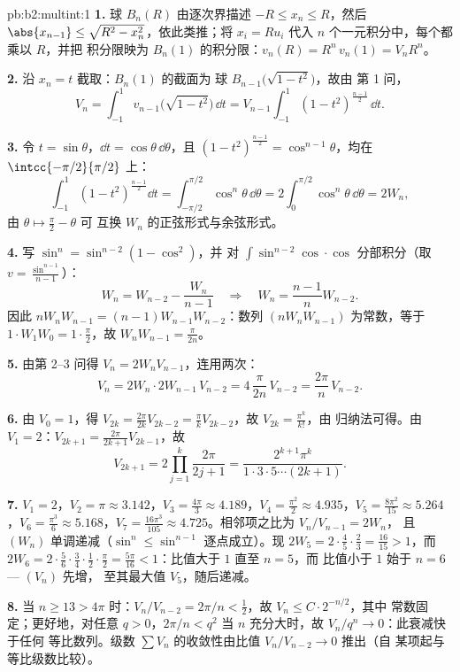 \begin{solution}{pb:b2:multint:1}
\textbf{1.} 球 $B_n(R)$ 由逐次界描述
$-R \leq x_n \leq R$，然后 $\abs{x_{n-1}} \leq \sqrt{R^2 -
x_n^2}$，依此类推；将 $x_i = Ru_i$ 代入
$n$ 个一元积分中，每个都乘以 $R$，并把
积分限映为 $B_n(1)$ 的积分限：$v_n(R) = R^n\,v_n(1) =
V_nR^n$。

\textbf{2.} 沿 $x_n = t$ 截取：$B_n(1)$ 的截面为
球 $B_{n-1}\bigl(\sqrt{1 - t^2}\bigr)$，故由
第 1 问，
\[
V_n = \int_{-1}^1 v_{n-1}\bigl(\sqrt{1 - t^2}\bigr)\,\dd t
= V_{n-1}\int_{-1}^{1}(1 - t^2)^{\frac{n-1}2}\,\dd t .
\]

\textbf{3.} 令 $t = \sin\theta$，$\dd t =
\cos\theta\,\dd\theta$，且 $(1 - t^2)^{\frac{n-1}2} =
\cos^{n-1}\theta$，均在 $\intcc{-\pi/2}{\pi/2}$ 上：
\[
\int_{-1}^1(1 - t^2)^{\frac{n-1}2}\dd t
= \int_{-\pi/2}^{\pi/2}\cos^n\theta\,\dd\theta
= 2\int_0^{\pi/2}\cos^n\theta\,\dd\theta = 2W_n,
\]
由 $\theta \mapsto \frac\pi2 - \theta$ 可
互换 $W_n$ 的正弦形式与余弦形式。

\textbf{4.} 写 $\sin^n = \sin^{n-2}(1 - \cos^2)$，并
对 $\int\sin^{n-2}\cos\cdot\cos$ 分部积分（取 $v =
\frac{\sin^{n-1}}{n-1}$）：
\[
W_n = W_{n-2} - \frac{W_n}{n-1}
\quad\Longrightarrow\quad
W_n = \frac{n-1}{n}W_{n-2}.
\]
因此 $nW_nW_{n-1} = (n-1)W_{n-1}W_{n-2}$：数列
$(nW_nW_{n-1})$ 为常数，等于 $1\cdot W_1W_0 =
1\cdot\frac\pi2$，故 $W_nW_{n-1} = \frac{\pi}{2n}$。

\textbf{5.} 由第 2--3 问得 $V_n = 2W_nV_{n-1}$，连用两次：
\[
V_n = 2W_n\cdot 2W_{n-1}\,V_{n-2}
= 4\,\frac{\pi}{2n}\,V_{n-2} = \frac{2\pi}n\,V_{n-2}.
\]

\textbf{6.} 由 $V_0 = 1$，得 $V_{2k} = \frac{2\pi}{2k}V_{2k-2}
= \frac\pi kV_{2k-2}$，故 $V_{2k} = \frac{\pi^k}{k!}$，由
归纳法可得。由 $V_1 = 2$：$V_{2k+1} =
\frac{2\pi}{2k+1}V_{2k-1}$，故
\[
V_{2k+1} = 2\prod_{j=1}^k\frac{2\pi}{2j+1}
= \frac{2^{k+1}\pi^k}{1\cdot3\cdot5\cdots(2k+1)} .
\]

\textbf{7.} $V_1 = 2$，$V_2 = \pi \approx 3.142$，$V_3 =
\frac{4\pi}3 \approx 4.189$，$V_4 = \frac{\pi^2}2 \approx
4.935$，$V_5 = \frac{8\pi^2}{15} \approx 5.264$，$V_6 =
\frac{\pi^3}6 \approx 5.168$，$V_7 = \frac{16\pi^3}{105}
\approx 4.725$。相邻项之比为 $V_n/V_{n-1} = 2W_n$，
且 $(W_n)$ 单调递减（$\sin^n \leq \sin^{n-1}$
逐点成立）。现 $2W_5 = 2\cdot\frac45\cdot\frac23 =
\frac{16}{15} > 1$，而 $2W_6 =
2\cdot\frac56\cdot\frac34\cdot\frac12\cdot\frac\pi2 =
\frac{5\pi}{16} < 1$：比值大于 $1$ 直至 $n = 5$，而
比值小于 $1$ 始于 $n = 6$ --- $(V_n)$ 先增，
至其最大值 $V_5$，随后递减。

\textbf{8.} 当 $n \geq 13 > 4\pi$ 时：$V_n/V_{n-2} = 2\pi/n <
\tfrac12$，故 $V_{n} \leq C\cdot 2^{-n/2}$，其中
常数固定；更好地，对任意 $q > 0$，$2\pi/n < q^2$ 当
$n$ 充分大时，故 $V_n/q^n \to 0$：此衰减快于任何
等比数列。级数 $\sum V_n$ 的收敛性由比值
$V_n/V_{n-2} \to 0$ 推出（自
某项起与等比级数比较）。


\end{solution}
